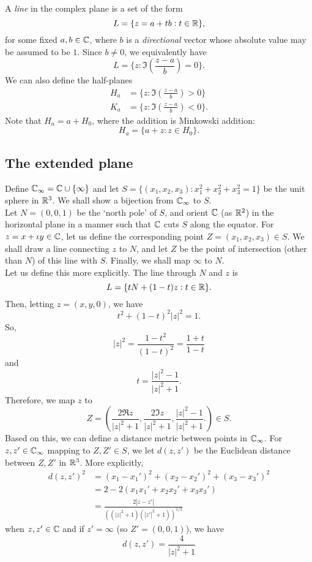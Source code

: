 	A \emph{line} in the complex plane is a set of the form
	\[ L = \{ z = a+tb : t \in \mathbb{R} \}, \]
	for some fixed $a,b\in\mathbb{C}$, where $b$ is a \emph{directional} vector whose absolute value may be assumed to be $1$. Since $b \ne 0$, we equivalently have
	\[ L = \{ z : \Im\left( \frac{z-a}{b} \right) = 0 \}. \]
	We can also define the half-planes
	\begin{align*}
		H_a &= \{ z : \Im\left( \frac{z-a}{b} \right) > 0 \} \\
		K_a &= \{ z : \Im\left( \frac{z-a}{b} \right) < 0 \}.
	\end{align*}
	Note that $H_a = a + H_0$, where the addition is Minkowski addition:
	\[ H_a = \{ a + z : z \in H_0 \}. \]

\subsection{The extended plane}
	
	Define $\mathbb{C}_\infty = \mathbb{C} \cup \{\infty\}$ and let $S = \{(x_1,x_2,x_3) : x_1^2 + x_2^2 + x_3^2 = 1\}$ be the unit sphere in $\mathbb{R}^3$. We shall show a bijection from $\mathbb{C}_\infty$ to $S$.\\
	Let $N = (0,0,1)$ be the `north pole' of $S$, and orient $\mathbb{C}$ (as $\mathbb{R}^2$) in the horizontal plane in a manner such that $\mathbb{C}$ cuts $S$ along the equator. For $z = x + \iota y \in \mathbb{C}$, let us define the corresponding point $Z = (x_1,x_2,x_3) \in S$. We shall draw a line connecting $z$ to $N$, and let $Z$ be the point of intersection (other than $N$) of this line with $S$. Finally, we shall map $\infty$ to $N$.\\
	Let us define this more explicitly. The line through $N$ and $z$ is
	\[ L = \{ tN + (1-t)z : t \in \mathbb{R} \}. \]
	Then, letting $z = (x,y,0)$, we have
	\[ t^2 + (1-t)^2 |z|^2 = 1. \]
	So,
	\[ |z|^2 = \frac{1-t^2}{(1-t)^2} = \frac{1+t}{1-t} \]
	and
	\[ t = \frac{|z|^2-1}{|z|^2+1}. \]
	Therefore, we map $z$ to
	\[ Z = \left( \frac{2 \Re z}{|z|^2+1} , \frac{2 \Im z}{|z|^2+1} , \frac{|z|^2-1}{|z|^2+1}. \right) \in S. \]
	Based on this, we can define a distance metric between points in $\mathbb{C}_\infty$. For $z,z' \in \mathbb{C}_\infty$ mapping to $Z,Z' \in S$, we let $d(z,z')$ be the Euclidean distance between $Z,Z'$ in $\mathbb{R}^3$. More explicitly,
	\begin{align*}
		d(z,z')^2 &= (x_1 - x_1')^2 + (x_2 - x_2')^2 + (x_3 - x_3')^2 \\
			&= 2 - 2(x_1x_1' + x_2x_2' + x_3x_3') \\
			&= \frac{2|z-z'|}{\left((|z|^2+1) (|z'|^2+1)\right)^{1/2}}
	\end{align*}
	when $z,z'\in\mathbb{C}$ and if $z' = \infty$ (so $Z' = (0,0,1)$), we have
	\[ d(z,z') = \frac{4}{|z|^2 + 1} \]

